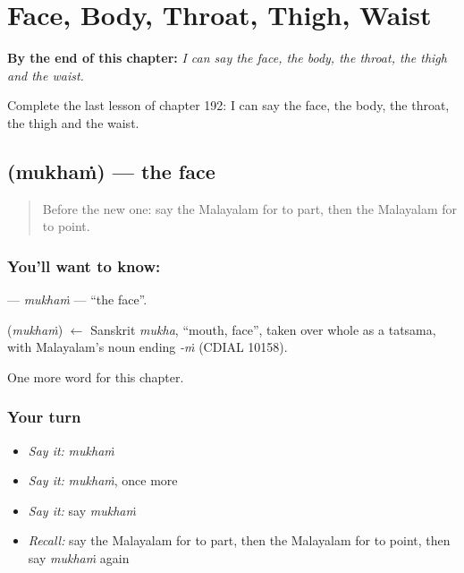 
\chapter{Face, Body, Throat, Thigh, Waist}
\label{ch:ml-face-body-throat-thigh-waist}

\begin{chapteropening}
\textbf{By the end of this chapter:} \emph{I can say the face, the body, the throat, the thigh and the waist.}

Complete the last lesson of chapter 192: I can say the face, the body, the throat, the thigh and the waist.
\end{chapteropening}

\section[\texorpdfstring{\ml{മുഖം} (mukhaṁ)}{മുഖം (mukhaṁ)}]{ (mukhaṁ) — the face}

\label{lesson:ML-C192-mukham}



\begin{quote}
Before the new one: say the Malayalam for to part, then the Malayalam for to point.
\end{quote}

\subsection*{You'll want to know: }
\textbf{} — \emph{mukhaṁ} — \textquotedblleft{}the face\textquotedblright{}.

\begin{cousinweb}
\textbf{} (\emph{mukhaṁ}) $\leftarrow$ Sanskrit \emph{mukha}, \textquotedblleft{}mouth, face\textquotedblright{}, taken over whole as a tatsama, with Malayalam's noun ending \emph{-ṁ} (CDIAL 10158).
\end{cousinweb}

\begin{grammarlens}[title={What you've built}]
One more word for this chapter.
\end{grammarlens}

\subsection*{Your turn}
\begin{itemize}
\raggedright
  \item \emph{Say it:} \emph{mukhaṁ}
  \item \emph{Say it:} \emph{mukhaṁ}, once more
  \item \emph{Say it:} say \emph{mukhaṁ}
  \item \emph{Recall:} say the Malayalam for to part, then the Malayalam for to point, then say \emph{mukhaṁ} again
\end{itemize}

